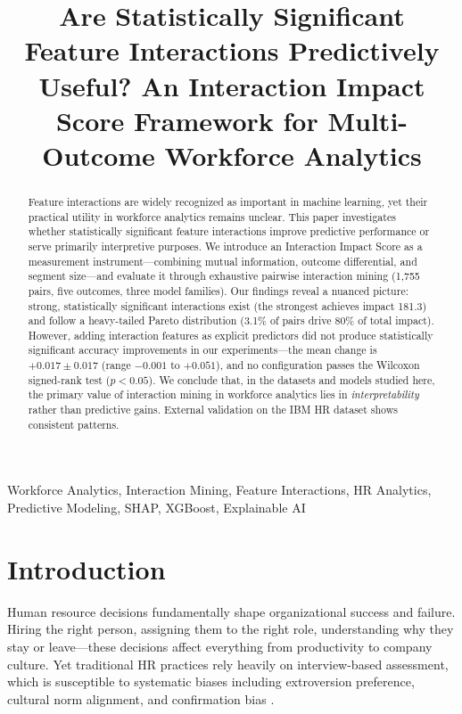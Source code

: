 \documentclass[conference]{IEEEtran}
\title{Are Statistically Significant Feature Interactions Predictively Useful? An Interaction Impact Score Framework for Multi-Outcome Workforce Analytics}
\author{
    \IEEEauthorblockN{Nayan Dhurve}
    \IEEEauthorblockA{
        Independent Researcher\\
        Nagpur, Maharashtra, India\\
        \texttt{nayankdhurve@gmail.com}\\
        ORCID: 0009-0005-8051-4988
    }
}
\begin{document}
\maketitle

\begin{abstract}
Feature interactions are widely recognized as important in machine learning, yet their practical utility in workforce analytics remains unclear. This paper investigates whether statistically significant feature interactions improve predictive performance or serve primarily interpretive purposes. We introduce an Interaction Impact Score as a measurement instrument---combining mutual information, outcome differential, and segment size---and evaluate it through exhaustive pairwise interaction mining (1,755 pairs, five outcomes, three model families). Our findings reveal a nuanced picture: strong, statistically significant interactions exist (the strongest achieves impact 181.3) and follow a heavy-tailed Pareto distribution (3.1\% of pairs drive 80\% of total impact). However, adding interaction features as explicit predictors did not produce statistically significant accuracy improvements in our experiments---the mean change is $+0.017\pm0.017$ (range $-0.001$ to $+0.051$), and no configuration passes the Wilcoxon signed-rank test ($p < 0.05$). We conclude that, in the datasets and models studied here, the primary value of interaction mining in workforce analytics lies in \textit{interpretability} rather than predictive gains. External validation on the IBM HR dataset shows consistent patterns.
\end{abstract}

\begin{IEEEkeywords}
Workforce Analytics, Interaction Mining, Feature Interactions, HR Analytics, Predictive Modeling, SHAP, XGBoost, Explainable AI
\end{IEEEkeywords}

\section{Introduction}
\label{sec:introduction}

Human resource decisions fundamentally shape organizational success and failure. Hiring the right person, assigning them to the right role, understanding why they stay or leave---these decisions affect everything from productivity to company culture. Yet traditional HR practices rely heavily on interview-based assessment, which is susceptible to systematic biases including extroversion preference, cultural norm alignment, and confirmation bias \cite{fabris2025fairness}.
\end{document}
